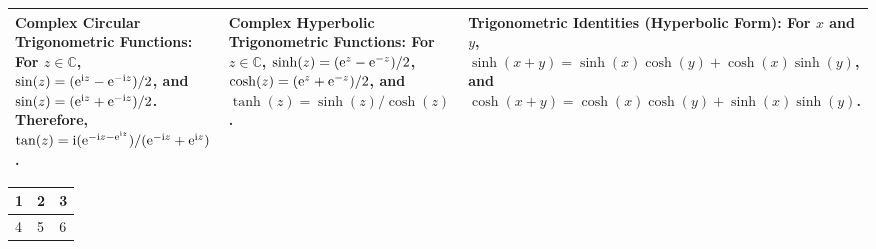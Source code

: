 \begin{tabular}{|m{.31\linewidth}|m{.31\linewidth}|m{.31\linewidth}|}
        \textbf{Complex Circular Trigonometric Functions}: For
        $z\in\mathbb{C}$, $\sin(z)=(\mathrm{e}^{\mathrm{i}z}-
        \mathrm{e}^{-\mathrm{i}z})/2$, and $\sin(z)=(\mathconst{e}%
        ^{\mathconst{i}z}+\mathconst{e}^{-\mathconst{i}z})/2$. Therefore,
        $\tan(z)=\mathconst{i}(\mathconst{e}^{-\mathconst{i}z-\mathconst{e}%
        ^{\mathconst{i}z}})/(\mathconst{e}^{-\mathconst{i}z}+\mathconst{e}%
        ^{\mathconst{i}z})$. &
        \textbf{Complex Hyperbolic Trigonometric Functions}: For
        $z\in\mathbb{C}$, $\sinh(z)=(\mathrm{e}^z-\mathrm{e}^{-z})/2$,
        $\cosh(z)=(\mathrm{e}^z+\mathrm{e}^{-z})/2$, and
        $\tanh(z)=\sinh(z)/\cosh(z)$. &
        \textbf{Trigonometric Identities (Hyperbolic Form)}: For $x$ and $y$,
        $\sinh(x+y)=\sinh(x)\cosh(y) + \cosh(x)\sinh(y)$, and
        $\cosh(x+y)=\cosh(x)\cosh(y) + \sinh(x)\sinh(y)$. \\
        \hline
\end{tabular}
\clearpage
%
%
\begin{tabular}{|m{.31\linewidth}|m{.31\linewidth}|m{.31\linewidth}|}
        \hline
        1 & 2 & 3 \\
        \hline
        4 & 5 & 6 \\
        \hline
\end{tabular}


